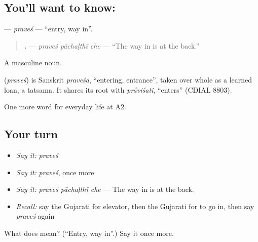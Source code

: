 \subsection*{You'll want to know: }
\textbf{} — \emph{praveś} — \textquotedblleft{}entry, way in\textquotedblright{}.

\begin{quote}
\textbf{  .} — \emph{praveś pāchaḷthī che} — \textquotedblleft{}The way in is at the back.\textquotedblright{}
\end{quote}

A masculine noun.

\begin{cousinweb}
\textbf{} (\emph{praveś}) is Sanskrit \emph{praveśa}, \textquotedblleft{}entering, entrance\textquotedblright{}, taken over whole as a learned loan, a tatsama. It shares its root with \emph{práviśati}, \textquotedblleft{}enters\textquotedblright{} (CDIAL 8803).
\end{cousinweb}

\begin{grammarlens}[title={What you've built}]
One more word for everyday life at A2.
\end{grammarlens}

\subsection*{Your turn}
\begin{itemize}
\raggedright
  \item \emph{Say it:} \emph{praveś}
  \item \emph{Say it:} \emph{praveś}, once more
  \item \emph{Say it:} \emph{praveś pāchaḷthī che} — The way in is at the back.
  \item \emph{Recall:} say the Gujarati for elevator, then the Gujarati for to go in, then say \emph{praveś} again
\end{itemize}

\begin{tcolorbox}[breakable,colback=teal!4,colframe=teal!35!black,title={Before you move on}]
What does  mean? (\textquotedblleft{}Entry, way in\textquotedblright{}.) Say it once more.
\end{tcolorbox}
